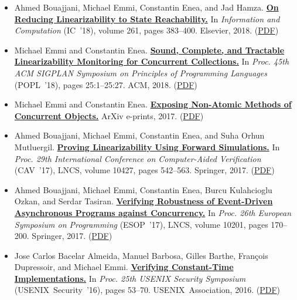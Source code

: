\documentclass{article}
\begin{document}
\begin{itemize}[leftmargin=0cm,label={}]
    \item Ahmed Bouajjani, Michael Emmi, Constantin Enea, and Jad Hamza. {\bf\href{%
    https://doi.org/10.1016/j.ic.2018.02.014}{%
    On Reducing Linearizability to State Reachability.}} In \emph{ Information and Computation } (IC ’18), volume 261, pages 383–400. Elsevier, 2018. (\href{https://michael-emmi.github.io/https://github.com/michael-emmi/research-papers/raw/master/journals-iandc-BouajjaniEEH18.pdf}{PDF})


    \item Michael Emmi and Constantin Enea. {\bf\href{%
    http://doi.acm.org/10.1145/3158113}{%
    Sound, Complete, and Tractable Linearizability Monitoring for Concurrent Collections.}} In \emph{ Proc. 45th ACM SIGPLAN Symposium on Principles of Programming Languages } (POPL ’18), pages 25:1–25:27. ACM, 2018. (\href{https://michael-emmi.github.io/https://github.com/michael-emmi/research-papers/raw/master/conf-popl-EmmiE18.pdf}{PDF})


    \item Michael Emmi and Constantin Enea. {\bf\href{%
    https://arxiv.org/abs/1706.09305}{%
    Exposing Non-Atomic Methods of Concurrent Objects.}} ArXiv e-prints, 2017. (\href{https://michael-emmi.github.io/https://github.com/michael-emmi/research-papers/raw/master/journals-corr-EmmiE17.pdf}{PDF})


    \item Ahmed Bouajjani, Michael Emmi, Constantin Enea, and Suha Orhun Mutluergil. {\bf\href{%
    https://doi.org/10.1007/978-3-319-63390-9}{%
    Proving Linearizability Using Forward Simulations.}} In \emph{ Proc. 29th International Conference on Computer-Aided Verification } (CAV ’17), LNCS, volume 10427, pages 542–563. Springer, 2017. (\href{https://michael-emmi.github.io/https://github.com/michael-emmi/research-papers/raw/master/conf-cav-BouajjaniEEM17.pdf}{PDF})


    \item Ahmed Bouajjani, Michael Emmi, Constantin Enea, Burcu Kulahcioglu Ozkan, and Serdar Tasiran. {\bf\href{%
    http://dx.doi.org/10.1007/978-3-662-54434-1_7}{%
    Verifying Robustness of Event-Driven Asynchronous Programs against Concurrency.}} In \emph{ Proc. 26th European Symposium on Programming } (ESOP ’17), LNCS, volume 10201, pages 170–200. Springer, 2017. (\href{https://michael-emmi.github.io/https://github.com/michael-emmi/research-papers/raw/master/conf-esop-BouajjaniEEOT17.pdf}{PDF})


    \item Jose Carlos Bacelar Almeida, Manuel Barbosa, Gilles Barthe, François Dupressoir, and Michael Emmi. {\bf\href{%
    https://www.usenix.org/conference/usenixsecurity16/technical-sessions/presentation/almeida}{%
    Verifying Constant-Time Implementations.}} In \emph{ Proc. 25th USENIX Security Symposium } (USENIX Security ’16), pages 53–70. USENIX Association, 2016. (\href{https://michael-emmi.github.io/https://github.com/michael-emmi/research-papers/raw/master/conf-uss-AlmeidaBBDE16.pdf}{PDF})



\end{itemize}
\end{document}
